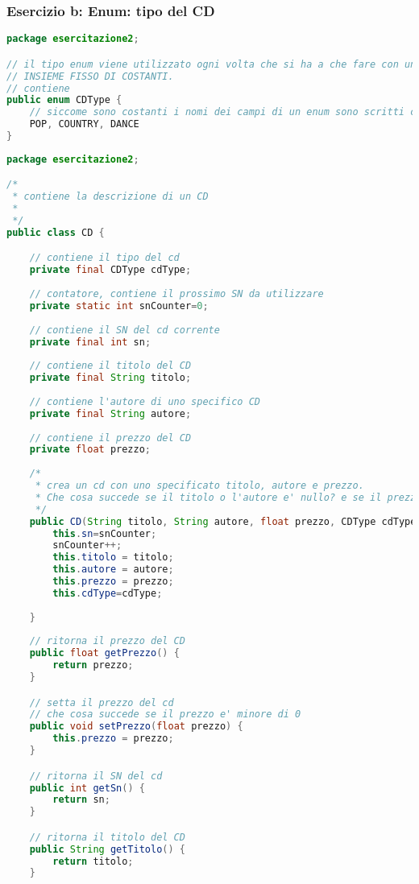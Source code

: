 \documentclass{article}
\begin{document}
\subsubsection{Esercizio b: Enum: tipo del CD}

\begin{lstlisting}[language=Java,escapechar=|]
package esercitazione2;

// il tipo enum viene utilizzato ogni volta che si ha a che fare con un 
// INSIEME FISSO DI COSTANTI. 
// contiene 
public enum CDType {
	// siccome sono costanti i nomi dei campi di un enum sono scritti con lettere upper case
	POP, COUNTRY, DANCE
}
\end{lstlisting}

\begin{lstlisting}[language=Java,escapechar=|]
package esercitazione2;

/*
 * contiene la descrizione di un CD
 *
 */
public class CD {

	// contiene il tipo del cd
	private final CDType cdType;
	
	// contatore, contiene il prossimo SN da utilizzare
	private static int snCounter=0;
	
	// contiene il SN del cd corrente
	private final int sn;
	
	// contiene il titolo del CD
	private final String titolo;
	
	// contiene l'autore di uno specifico CD
	private final String autore;
	
	// contiene il prezzo del CD
	private float prezzo;
	
	/*
	 * crea un cd con uno specificato titolo, autore e prezzo.
	 * Che cosa succede se il titolo o l'autore e' nullo? e se il prezzo e' minore di 0?
	 */
	public CD(String titolo, String autore, float prezzo, CDType cdType){
		this.sn=snCounter;
		snCounter++;
		this.titolo = titolo;
		this.autore = autore;
		this.prezzo = prezzo;
		this.cdType=cdType;
		
	}
	
	// ritorna il prezzo del CD
	public float getPrezzo() {
		return prezzo;
	}

	// setta il prezzo del cd
	// che cosa succede se il prezzo e' minore di 0
	public void setPrezzo(float prezzo) {
		this.prezzo = prezzo;
	}

	// ritorna il SN del cd
	public int getSn() {
		return sn;
	}

	// ritorna il titolo del CD
	public String getTitolo() {
		return titolo;
	}


\end{lstlisting}
\end{document}

